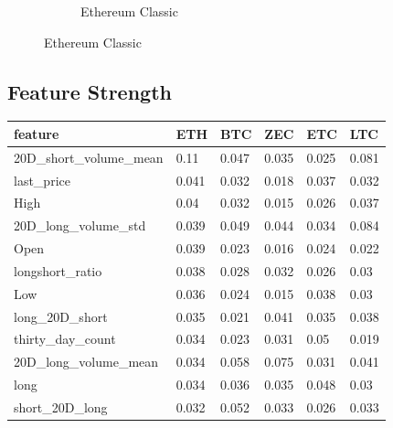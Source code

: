 \documentclass[letterpaper]{article}
\begin{document}
\begin{figure}[H]
\begin{subfigure}[b]{0.45\linewidth}
        \caption{Ethereum Classic}  
        \label{fig:etc}
    \end{subfigure}
\end{figure}

\newpage
\subsection{Feature Strength}
\label{sec:feature_strength}
\begin{table}[H]
    \begin{tabular}{|l|l|l|l|l|l|}
    \hline
    \textbf{feature}                    & \textbf{ETH} & \textbf{BTC} & \textbf{ZEC} & \textbf{ETC} & \textbf{LTC} \\ \hline
    20D\_short\_volume\_mean            & 0.11         & 0.047        & 0.035        & 0.025        & 0.081        \\ \hline
    last\_price                         & 0.041        & 0.032        & 0.018        & 0.037        & 0.032        \\ \hline
    High                                & 0.04         & 0.032        & 0.015        & 0.026        & 0.037        \\ \hline
    20D\_long\_volume\_std              & 0.039        & 0.049        & 0.044        & 0.034        & 0.084        \\ \hline
    Open                                & 0.039        & 0.023        & 0.016        & 0.024        & 0.022        \\ \hline
    longshort\_ratio                    & 0.038        & 0.028        & 0.032        & 0.026        & 0.03         \\ \hline
    Low                                 & 0.036        & 0.024        & 0.015        & 0.038        & 0.03         \\ \hline
    long\_20D\_short                    & 0.035        & 0.021        & 0.041        & 0.035        & 0.038        \\ \hline
    thirty\_day\_count                  & 0.034        & 0.023        & 0.031        & 0.05         & 0.019        \\ \hline
    20D\_long\_volume\_mean             & 0.034        & 0.058        & 0.075        & 0.031        & 0.041        \\ \hline
    long                                & 0.034        & 0.036        & 0.035        & 0.048        & 0.03         \\ \hline
    short\_20D\_long                    & 0.032        & 0.052        & 0.033        & 0.026        & 0.033        \\ \hline

\end{tabular}
\end{table}
\end{document}
